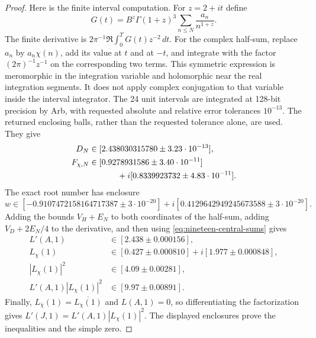 \begin{proof}
Here is the finite interval computation. For $z=2+it$ define
\[
 G(t)=B^z\Gamma(1+z)^3
       \sum_{n\leq N}\frac{a_n}{n^{1+z}}.
\]
The finite derivative is
$2\pi^{-1}\Re\int_0^T G(t)z^{-2}\,dt$.
For the complex half-sum, replace $a_n$ by $a_n\chi(n)$,
add its value at $t$ and at $-t$, and integrate with the
factor $(2\pi)^{-1}z^{-1}$ on the corresponding two terms.
This symmetric expression is meromorphic in the integration
variable and holomorphic near the real integration segments.
It does not apply complex conjugation to that variable
inside the interval integrator. The 24 unit intervals are
integrated at 128-bit precision by Arb, with requested absolute
and relative error tolerances $10^{-13}$. The returned enclosing
balls, rather than the requested tolerance alone, are used.
They give
\[
 \begin{split}
 D_N&\in[2.438030315780\mathbin\pm3.23\cdot10^{-13}],\\
 F_{\chi,N}&\in[0.9278931586\mathbin\pm3.40\cdot10^{-11}]\\
   &\hspace{12mm}+i[0.8339923732\mathbin\pm4.83\cdot10^{-11}].
 \end{split}
\]
The exact root number has enclosure
\[
 w\in[-0.9107472158164717387\mathbin\pm3\cdot10^{-20}]
       +i[0.4129642949245673588\mathbin\pm3\cdot10^{-20}].
\]
Adding the bounds $V_H+E_N$ to both coordinates of the
half-sum, adding $V_D+2E_N/4$ to the derivative, and then
using \eqref{eq:nineteen-central-sums} gives
\[
 \begin{split}
 L'(A,1)&\in[2.438\mathbin\pm0.000156],\\
 L_\chi(1)&\in[0.427\mathbin\pm0.000810]
                   +i[1.977\mathbin\pm0.000848],\\
 |L_\chi(1)|^2&\in[4.09\mathbin\pm0.00281],\\
 L'(A,1)|L_\chi(1)|^2&\in[9.97\mathbin\pm0.00891].
 \end{split}
\]
Finally, $L_{\bar\chi}(1)=\overline{L_\chi(1)}$ and
$L(A,1)=0$, so differentiating the factorization gives
$L'(J,1)=L'(A,1)|L_\chi(1)|^2$. The displayed enclosures
prove the inequalities and the simple zero.
\end{proof}

